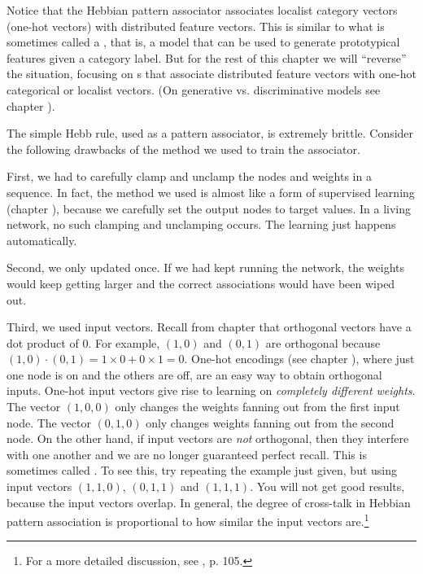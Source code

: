 Notice that the Hebbian pattern associator associates localist category vectors (one-hot vectors) with distributed feature vectors. This is similar to what is sometimes called a , that is, a model that can be used to generate prototypical features given a category label.  But for the rest of this chapter we will ``reverse'' the situation, focusing on s that associate distributed feature vectors with one-hot categorical or localist vectors. (On generative vs. discriminative models see chapter ).

The simple Hebb rule, used as a pattern associator, is extremely brittle. Consider the following drawbacks of the method we used to train the associator.

First, we had to carefully clamp and unclamp the nodes and weights in a sequence. In fact, the method we used is almost like a form of supervised learning (chapter ), because we carefully set the output nodes to target values. In a living network, no such clamping and unclamping occurs. The learning just happens automatically. 

Second, we only updated once. If we had kept running the network, the weights would keep getting larger and the correct associations would have been wiped out. 

Third, we used  input vectors. Recall from chapter  that orthogonal vectors have a dot product of 0. For example, $(1,0)$ and $(0,1)$ are orthogonal because $(1,0) \cdot (0,1) = 1 \times 0 + 0 \times 1 = 0$. One-hot encodings (see chapter ), where just one node is on and the others are off, are an easy way to obtain orthogonal inputs. One-hot input vectors give rise to learning on \emph{completely different weights}. The vector $(1,0,0)$ only changes the weights fanning out from the first input node. The  vector $(0,1,0)$ only changes weights fanning out from the second node. On the other hand, if input vectors are {\em not} orthogonal, then they interfere with one another and we are no longer guaranteed perfect recall. This is sometimes called . To see this, try repeating the example just given, but using input vectors $(1,1,0)$, $(0,1,1)$ and $(1,1,1)$. You will not get good results, because the input vectors overlap. In general, the degree of cross-talk in Hebbian pattern association  is proportional to how similar the input vectors are.\footnote{For a more detailed discussion, see \cite{fausett1994fundamentals}, p. 105.}

